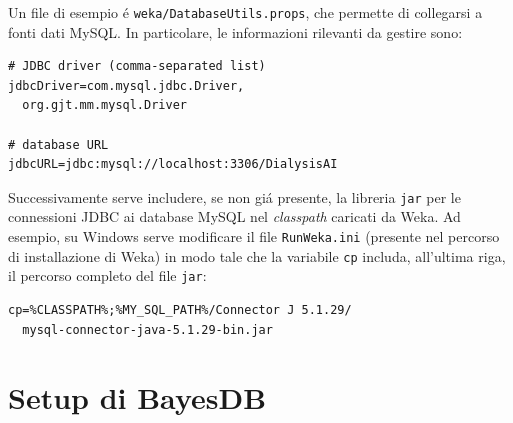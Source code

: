 \documentclass[preprint]{acm_proc_article-sp}
\begin{document}
Un file di esempio \'e \verb|weka/DatabaseUtils.props|, che permette di collegarsi a fonti dati MySQL. In particolare, le informazioni rilevanti da gestire sono:
\begin{verbatim}
# JDBC driver (comma-separated list)
jdbcDriver=com.mysql.jdbc.Driver,
  org.gjt.mm.mysql.Driver

# database URL
jdbcURL=jdbc:mysql://localhost:3306/DialysisAI
\end{verbatim}

Successivamente serve includere, se non gi\'a presente, la libreria \verb|jar| per le connessioni JDBC ai database MySQL nel \textit{classpath} caricati da Weka.
Ad esempio, su Windows serve modificare il file \verb|RunWeka.ini| (presente nel percorso di installazione di Weka) in modo tale che la variabile \verb|cp| includa, all'ultima riga, il percorso completo del file \verb|jar|:
\begin{verbatim}
cp=%CLASSPATH%;%MY_SQL_PATH%/Connector J 5.1.29/
  mysql-connector-java-5.1.29-bin.jar
\end{verbatim}

\section{Setup di BayesDB}

\balancecolumns

\end{document}
